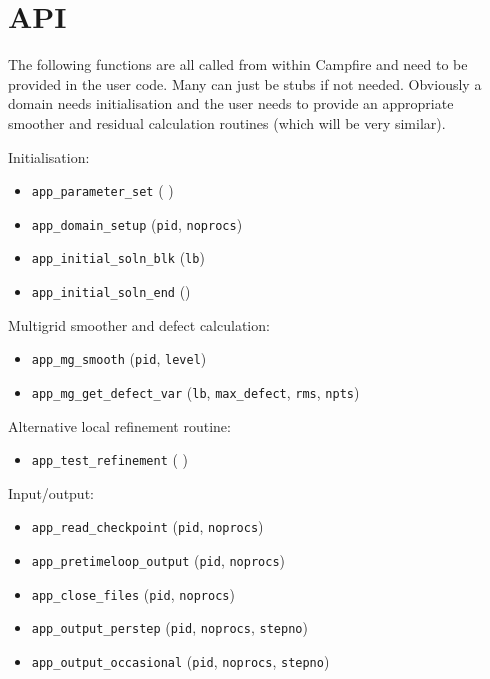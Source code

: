 \documentclass[paper=a4, fontsize=11pt,twoside,bibtotoc]{scrartcl}		%
\begin{document}

\section{API}
								\label{SEC_API}

The following functions are all called from within Campfire and need to be provided in the user code.  Many can just be stubs if not 
needed.  Obviously a domain needs initialisation and the user needs to provide an appropriate smoother and residual calculation routines (which 
will be very similar).

Initialisation:

\begin{itemize}
\item{\texttt{app\_parameter\_set}
 ( )}

\item{\texttt{app\_domain\_setup}
 (\texttt{pid}, \texttt{noprocs})}

\item{\texttt{app\_initial\_soln\_blk}
 (\texttt{lb})}

\item{\texttt{app\_initial\_soln\_end}
 ()}
\end{itemize}

Multigrid smoother and defect calculation:

\begin{itemize}
\item{\texttt{app\_mg\_smooth}
 (\texttt{pid}, \texttt{level})}

\item{\texttt{app\_mg\_get\_defect\_var}
 (\texttt{lb}, \texttt{max\_defect}, \texttt{rms}, \texttt{npts})}
\end{itemize}

Alternative local refinement routine:

\begin{itemize}
\item{\texttt{app\_test\_refinement}}
 ( )
\end{itemize}


Input/output:

\begin{itemize}
\item{\texttt{app\_read\_checkpoint}
 (\texttt{pid}, \texttt{noprocs})}

\item{\texttt{app\_pretimeloop\_output}
 (\texttt{pid}, \texttt{noprocs})}

\item{\texttt{app\_close\_files}
 (\texttt{pid}, \texttt{noprocs})}

\item{\texttt{app\_output\_perstep}
 (\texttt{pid}, \texttt{noprocs}, \texttt{stepno})}

\item{\texttt{app\_output\_occasional}
 (\texttt{pid}, \texttt{noprocs}, \texttt{stepno})}
\end{itemize}
\end{document}
